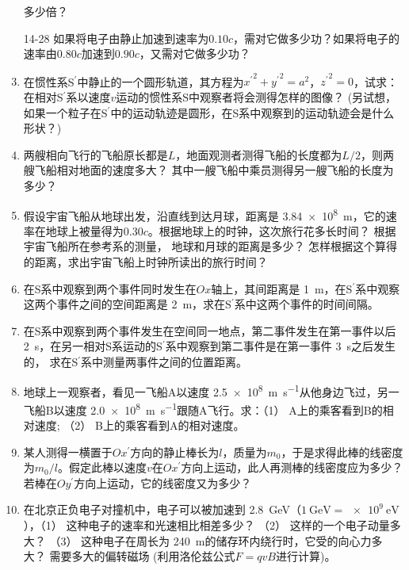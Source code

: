 \documentclass[UTF-8]{ctexart}
\newcommand{\csi}[2]{ \SI{#1}{#2}}
\begin{document}
\begin{enumerate}
        多少倍？
    \item[14-28] 如果将电子由静止加速到速率为\(0.10c\)，需对它做多少功？如果将电子的速率由\(0.80c\)加速到\(0.90c\)，又需对它做多少功？
    \item 在惯性系S\(^\prime\)中静止的一个圆形轨道，其方程为\({x^\prime}^2+{y^\prime}^2=a^2\)，\({z^\prime}^2=0\)，试求：在相对S\(^\prime\)系以速度\(v\)运动的惯性系S中观察者将会测得怎样的图像？ 
        (另试想，如果一个粒子在S\(^\prime\)中的运动轨迹是圆形，在S系中观察到的运动轨迹会是什么形状？)
    \item 两艘相向飞行的飞船原长都是\(L\)，地面观测者测得飞船的长度都为\(L/2\)，则两艘飞船相对地面的速度多大？ 其中一艘飞船中乘员测得另一艘飞船的长度为多少？ 
    \item 假设宇宙飞船从地球出发，沿直线到达月球，距离是\csi{3.84e8}{\m}，它的速率在地球上被量得为\(0.30c\)。根据地球上的时钟，这次旅行花多长时间？ 根据宇宙飞船所在参考系的测量，
        地球和月球的距离是多少？ 怎样根据这个算得的距离，求出宇宙飞船上时钟所读出的旅行时间？
    \item 在S系中观察到两个事件同时发生在\(Ox\)轴上，其间距离是\csi{1}{\m}，在S\(^\prime\)系中观察这两个事件之间的空间距离是\csi{2}{\m}，求在S\(^\prime\)系中这两个事件的时间间隔。
    \item 在S系中观察到两个事件发生在空间同一地点，第二事件发生在第一事件以后\csi{2}{\second}，在另一相对S系运动的S\(^\prime\)系中观察到第二事件是在第一事件\csi{3}{\second}之后发生的，
        求在S\(^\prime\)系中测量两事件之间的位置距离。
    \item 地球上一观察者，看见一飞船A以速度\csi{2.5e8}{\m\per\second}从他身边飞过，另一飞船B以速度\csi{2.0e8}{\m\per\second}跟随A飞行。求：（1） A上的乘客看到B的相对速度; 
        （2） B上的乘客看到A的相对速度。
    \item 某人测得一横置于\(Ox^\prime\)方向的静止棒长为\(l\)，质量为\(m_0\)，于是求得此棒的线密度为\(m_0/l\)。假定此棒以速度\(v\)在\(Ox^\prime\)方向上运动，此人再测棒的线密度应为多少？ 
        若棒在\(Oy^\prime\)方向上运动，它的线密度又为多少？
    \item 在北京正负电子对撞机中，电子可以被加速到\csi{2.8}{\GeV}（\(\csi{1}{\GeV}=\csi{e9}{\eV}\)），（1） 这种电子的速率和光速相比相差多少？ （2） 这样的一个电子动量多大？ 
        （3） 这种电子在周长为\csi{240}{\m}的储存环内绕行时，它受的向心力多大？ 需要多大的偏转磁场 (利用洛伦兹公式\(F=qvB\)进行计算)。    
\end{enumerate}
\end{document}
